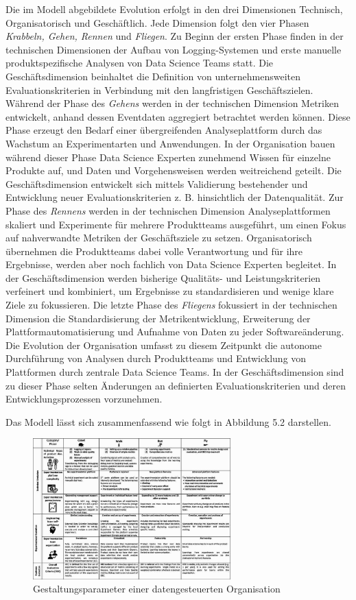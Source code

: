 Die im Modell abgebildete Evolution erfolgt in den drei Dimensionen Technisch, Organisatorisch und Geschäftlich. 
Jede Dimension folgt den vier Phasen \textit{Krabbeln, Gehen, Rennen} und \textit{Fliegen}.
Zu Beginn der ersten Phase finden in der technischen Dimensionen der Aufbau von Logging-Systemen und erste manuelle produktspezifische Analysen von Data Science Teams statt.
Die Geschäftsdimension beinhaltet die Definition von unternehmensweiten Evaluationskriterien in Verbindung mit den langfristigen Geschäftszielen.
Während der Phase des \textit{Gehens} werden in der technischen Dimension Metriken entwickelt, anhand dessen Eventdaten aggregiert betrachtet werden können.
Diese Phase erzeugt den Bedarf einer übergreifenden Analyseplattform durch das Wachstum an Experimentarten und Anwendungen. 
In der Organisation bauen während dieser Phase Data Science Experten zunehmend Wissen für einzelne Produkte auf, und Daten und Vorgehensweisen werden weitreichend geteilt.
Die Geschäftsdimension entwickelt sich mittels Validierung bestehender und Entwicklung neuer Evaluationskriterien z. B. hinsichtlich der Datenqualität.
Zur Phase des \textit{Rennens} werden in der technischen Dimension Analyseplattformen skaliert und Experimente für mehrere Produktteams ausgeführt, um einen Fokus auf nahverwandte Metriken der Geschäftsziele zu setzen.
Organisatorisch übernehmen die Produktteams dabei volle Verantwortung und für ihre Ergebnisse, werden aber noch fachlich von Data Science Experten begleitet.
In der Geschäftsdimension werden bisherige Qualitäts- und Leistungskriterien verfeinert und kombiniert, um Ergebnisse zu standardisieren und wenige klare Ziele zu fokussieren.
Die letzte Phase des \textit{Fliegens} fokussiert in der technischen Dimension die Standardisierung der Metrikentwicklung, Erweiterung der Plattformautomatisierung und Aufnahme von Daten zu jeder Softwareänderung.
Die Evolution der Organisation umfasst zu diesem Zeitpunkt die autonome Durchführung von Analysen durch Produktteams und Entwicklung von Plattformen durch zentrale Data Science Teams.
In der Geschäftsdimension sind zu dieser Phase selten Änderungen an definierten Evaluationskriterien und deren Entwicklungsprozessen vorzunehmen.

Das Modell lässt sich zusammenfassend wie folgt in Abbildung 5.2 darstellen.
\begin{figure}[htb]
    \centering
    \includegraphics[width=0.68\textwidth]{graphics/EEM model.png}
    \caption{Gestaltungsparameter einer datengesteuerten Organisation}
    \label{fig:EEM model}
\end{figure}